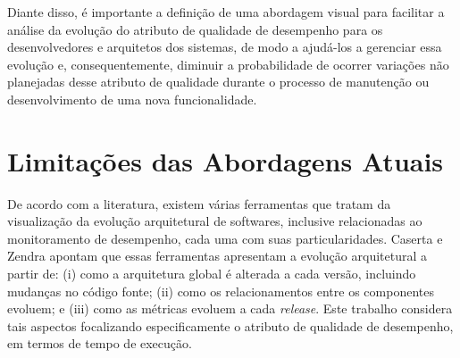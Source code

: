 



Diante disso, é importante a definição de uma abordagem visual para facilitar a análise da evolução do atributo de qualidade de desempenho para os desenvolvedores e arquitetos dos sistemas, de modo a ajudá-los a gerenciar essa evolução e, consequentemente, diminuir a probabilidade de ocorrer variações não planejadas desse atributo de qualidade durante o processo de manutenção ou desenvolvimento de uma nova funcionalidade.

\section{Limitações das Abordagens Atuais} \label{sec:limitacao-abordagens-atuais}

De acordo com a literatura, existem várias ferramentas que tratam da visualização da evolução arquitetural de softwares, inclusive relacionadas ao monitoramento de desempenho, cada uma com suas particularidades. Caserta e Zendra \cite{Caserta2011} apontam que essas ferramentas apresentam a evolução arquitetural a partir de: (i) como a arquitetura global é alterada a cada versão, incluindo mudanças no código fonte; (ii) como os relacionamentos entre os componentes evoluem; e (iii) como as métricas evoluem a cada \textit{release}. Este trabalho considera tais aspectos focalizando especificamente o atributo de qualidade de desempenho, em termos de tempo de execução.

